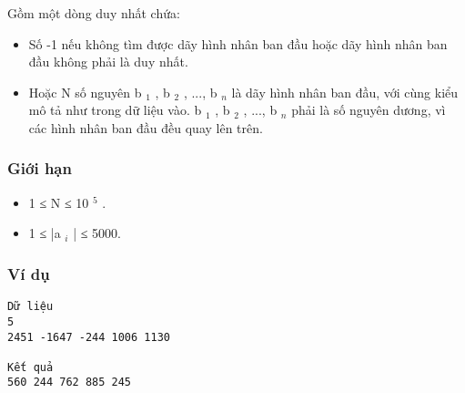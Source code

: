    Gồm một dòng duy nhất chứa:  
\begin{itemize}
	\item     Số -1 nếu không tìm được dãy hình nhân ban đầu hoặc dãy hình nhân ban đầu không phải là duy nhất.   
	\item     Hoặc N số nguyên b    $_     1    $    , b    $_     2    $    , ..., b    $_     n    $    là dãy hình nhân ban đầu, với cùng kiểu mô tả như trong dữ liệu vào. b    $_     1    $    , b    $_     2    $    , ..., b    $_     n    $    phải là số nguyên dương, vì các hình nhân ban đầu đều quay lên trên.   
\end{itemize}

\subsubsection{   Giới hạn  }
\begin{itemize}
	\item     1 ≤ N ≤ 10    $^     5    $    .   
	\item     1 ≤ |a    $_     i    $    | ≤ 5000.   
\end{itemize}

\subsubsection{   Ví dụ  }
\begin{verbatim}
Dữ liệu
5
2451 -1647 -244 1006 1130

Kết quả
560 244 762 885 245	
\end{verbatim}